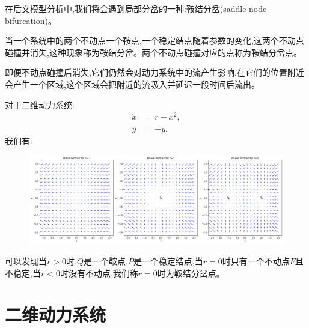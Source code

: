 在后文模型分析中,我们将会遇到局部分岔的一种:鞍结分岔(saddle-node bifurcation)。
\begin{defn}[鞍结分岔]
    当一个系统中的两个不动点一个鞍点,一个稳定结点随着参数的变化,这两个不动点碰撞并消失,这种现象称为鞍结分岔。两个不动点碰撞对应的点称为鞍结分岔点。
\end{defn}
即便不动点碰撞后消失,它们仍然会对动力系统中的流产生影响,在它们的位置附近会产生一个区域,这个区域会把附近的流吸入并延迟一段时间后流出\cite{strogatz2018nonlinear}。

\begin{exmp}
    对于二维动力系统:
    \begin{equation}\label{eq01}
        \begin{aligned}
            \dot{x}&=r-x^2,\\
            \dot{y}&=-y,
        \end{aligned}
    \end{equation}
    我们有:
    \begin{figure}[H]
        \centering
        \includegraphics[width=\textwidth]{Img/saddle-node.png}
    \end{figure}
    可以发现当$r>0$时,$Q$是一个鞍点,$P$是一个稳定结点,当$r=0$时只有一个不动点$F$且不稳定,当$r<0$时没有不动点,我们称$r=0$时为鞍结分岔点。
\end{exmp}
\section{二维动力系统}
